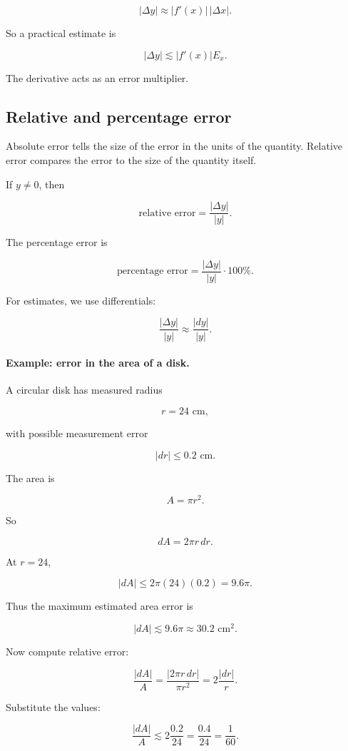 \[
\boxed{
|\Delta y|\approx |f'(x)|\,|\Delta x|.
}
\]

So a practical estimate is

\[
\boxed{
|\Delta y|\lesssim |f'(x)|E_x.
}
\]

The derivative acts as an error multiplier.

\subsection{Relative and percentage error}
\label{subsec:relative-percentage-error}

Absolute error tells the size of the error in the units of the quantity.  Relative error
compares the error to the size of the quantity itself.

If \(y\neq0\), then

\[
\text{relative error}
=
\frac{|\Delta y|}{|y|}.
\]

The percentage error is

\[
\text{percentage error}
=
\frac{|\Delta y|}{|y|}\cdot100\%.
\]

For estimates, we use differentials:

\[
\frac{|\Delta y|}{|y|}
\approx
\frac{|dy|}{|y|}.
\]

\paragraph{Example: error in the area of a disk.}
A circular disk has measured radius

\[
r=24\text{ cm},
\]

with possible measurement error

\[
|dr|\le0.2\text{ cm}.
\]

The area is

\[
A=\pi r^2.
\]

So

\[
dA=2\pi r\,dr.
\]

At \(r=24\),

\[
|dA|
\le
2\pi(24)(0.2)
=
9.6\pi.
\]

Thus the maximum estimated area error is

\[
\boxed{
|dA|\lesssim 9.6\pi\approx30.2\text{ cm}^2.
}
\]

Now compute relative error:

\[
\frac{|dA|}{A}
=
\frac{|2\pi r\,dr|}{\pi r^2}
=
2\frac{|dr|}{r}.
\]

Substitute the values:

\[
\frac{|dA|}{A}
\lesssim
2\frac{0.2}{24}
=
\frac{0.4}{24}
=
\frac{1}{60}.
\]

